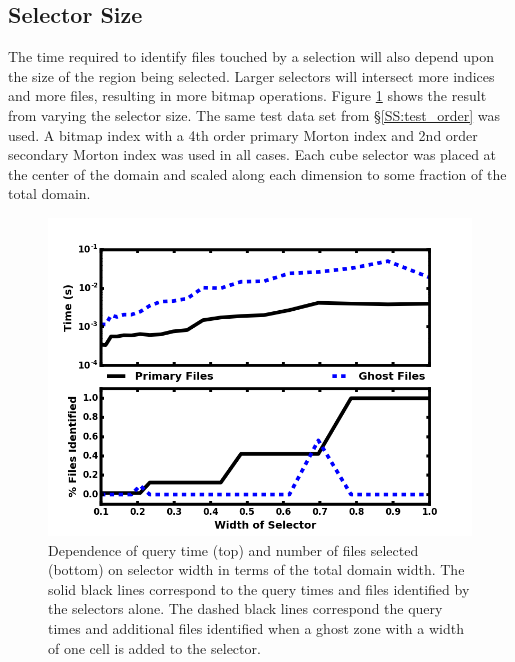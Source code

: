 \documentclass[apjl]{emulateapj}
\begin{document}
\subsection{Selector Size}\label{SS:test_size}
%
The time required to identify files touched by a selection will also depend upon the size of the region being selected. Larger selectors will intersect more indices and more files, resulting in more bitmap operations. Figure \ref{fig:test_size} shows the result from varying the selector size. The same test data set from \S\ref{SS:test_order} was used. A bitmap index with a 4th order primary Morton index and 2nd order secondary Morton index was used in all cases. Each cube selector was placed at the center of the domain and scaled along each dimension to some fraction of the total domain.
%
\begin{figure}[htbp]
\begin{center}
\includegraphics[width=\columnwidth,keepaspectratio]{../images/vary_selector_np1024_nf512.png}
\caption{Dependence of query time (top) and number of files selected (bottom) on selector width in terms of the total domain width. The solid black lines correspond to the query times and files identified by the selectors alone. The dashed black lines correspond the query times and additional files identified when a ghost zone with a width of one cell is added to the selector.}
\label{fig:test_size}
\end{center}
\end{figure}
%
\end{document}
